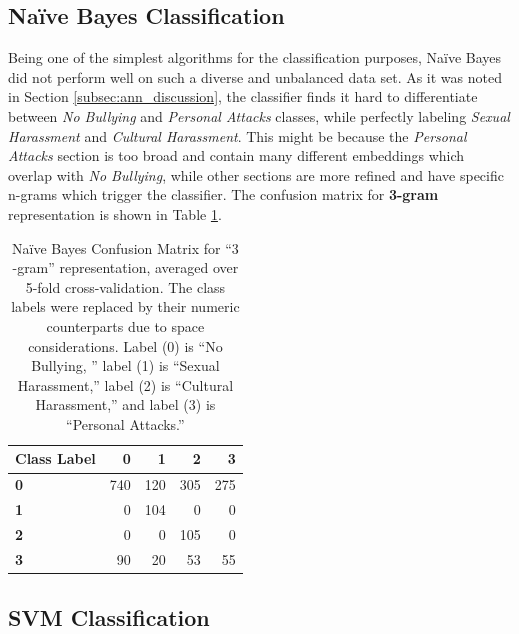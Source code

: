 \documentclass[conference]{sig-alternate-05-2015}
\begin{document}
\subsection{Na\"ive Bayes Classification}\label{subsec:bayes_discussion}
Being one of the simplest algorithms for the classification purposes, Na\"ive Bayes
did not perform well on such a diverse and unbalanced data set. As it was noted in
Section \ref{subsec:ann_discussion}, the classifier finds it hard to differentiate 
between \textit{No Bullying} and \textit{Personal Attacks} classes, while perfectly 
labeling \textit{Sexual Harassment} and \textit{Cultural Harassment}. This might be
because the \textit{Personal Attacks} section is too broad and contain many different
embeddings which overlap with \textit{No Bullying}, while other sections are more refined
and have specific n-grams which trigger the classifier. The confusion matrix for \textbf{3-gram}
representation is shown in Table \ref{tab:bayes_confusion_matrix}.

\begin{table}[ht!]
  \centering
  \begin{tabular}{| l | r | r | r | r |}
    \hline
    \textbf{Class Label} & \textbf{0} & \textbf{1} & \textbf{2} & \textbf{3} \\
    \hline\hline
    \textbf{0} & 740 & 120 & 305 & 275 \\
    \hline
    \textbf{1} & 0 & 104 & 0 & 0 \\
    \hline
    \textbf{2} & 0 & 0 & 105 & 0 \\
    \hline
    \textbf{3} & 90 & 20 & 53 & 55 \\
    \hline
  \end{tabular}
  \caption{Na\"ive Bayes Confusion Matrix for ``3 -gram'' representation,
  averaged over 5-fold cross-validation. The class labels were replaced by their
  numeric counterparts due to space considerations. Label (0) is
  ``No Bullying, '' label (1) is ``Sexual Harassment,'' label (2) is
  ``Cultural Harassment,'' and label (3) is ``Personal Attacks.''}
  \label{tab:bayes_confusion_matrix}
\end{table}


\subsection{SVM Classification}\label{subsec:svm_discussion}
\end{document}
